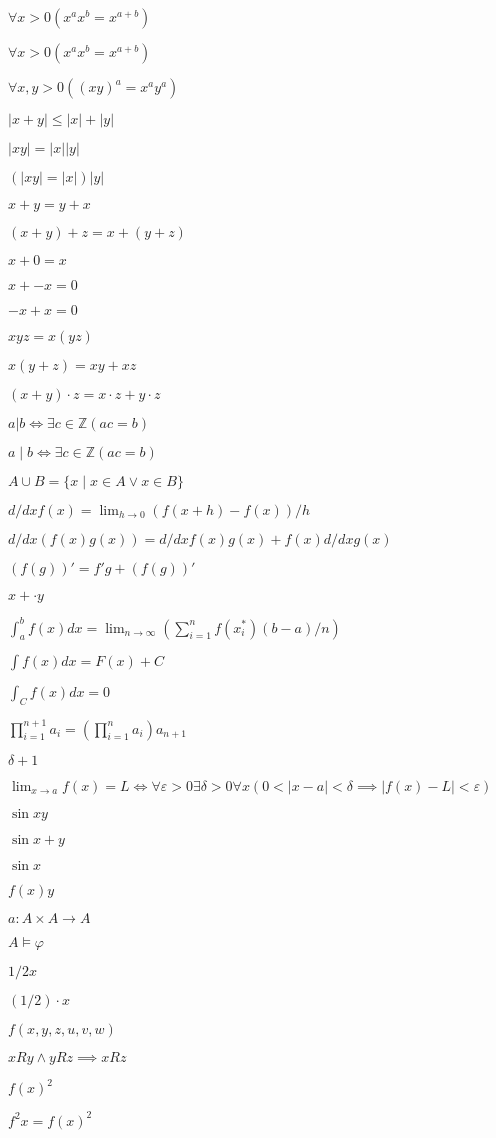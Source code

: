 \documentclass{article}
\begin{document}
$\forall x > 0(x^ax^b = x^{a+b})$

$\forall x > 0(x^ax^b = x^{a+b})$

$\forall x,y > 0((xy)^a = x^ay^a)$

$|x+y| \le |x|+|y|$

$|xy| = |x| |y|$

$(|xy| = |x|) |y|$

$x+y = y+x$

$(x+y)+z = x+(y+z)$

$x+0 = x$

$x+-x = 0$

$-x+x = 0$

$xyz = x(yz)$

$x(y+z) = xy+xz$

$(x+y)\cdot z = x\cdot z+y\cdot z$

$a|b \iff \exists c \in \mathbb Z (ac = b)$

$a\mid b \iff \exists c \in \mathbb Z (ac = b)$

$A\cup B = \{x \mid x \in A \lor x \in B\}$

$d/dxf(x) = \lim_{h\to 0} (f(x+h)-f(x))/h$

$d/dx(f(x)g(x)) = d/dxf(x)g(x)+f(x)d/dxg(x)$

$(f(g))' = f'g+(f(g))'$

$x+\cdot y$

$\int_a^bf(x)dx = \lim_{n\to \infty } (\sum_{i = 1}^nf(x_i^*)(b-a)/n)$

$\int f(x)dx = F(x)+C$

$\int_C f(x)dx = 0$

$\prod_{i = 1}^{n+1}a_i = (\prod_{i = 1}^na_i)a_{n+1}$

$\delta +1$

$\lim_{x\to a} f(x) = L \iff \forall \varepsilon  > 0\exists \delta  > 0\forall x(0 < |x-a| < \delta  \implies |f(x)-L| < \varepsilon )$

$\sin xy$

$\sin x+y$

$\sin x$

$f(x)y$

$a:A\times A\to A$

$A \models \varphi $

$1/2x$

$(1/2)\cdot x$

$f(x,y,z,u,v,w)$

$x R y \land y R z \implies x R z$

$f(x)^2$

$f^2x = f(x)^2$
\end{document}
